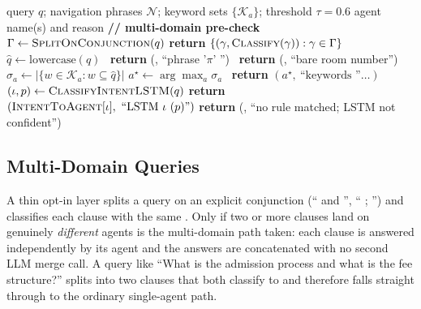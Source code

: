 \begin{algorithm}[!t]
\caption{Multi-Agent Query Routing}
\label{alg:routing}
\begin{algorithmic}[1]
\Require query $q$; navigation phrases $\mathcal{N}$; keyword sets $\{\mathcal{K}_a\}$;
threshold $\tau = 0.6$
\Ensure agent name(s) and reason
\State \textbf{// multi-domain pre-check}
\State $\Gamma \gets \textsc{SplitOnConjunction}(q)$ 
  \State \textbf{return} $\{(\gamma, \textsc{Classify}(\gamma)) : \gamma \in \Gamma\}$ 
\EndIf
\State $\hat q \gets \text{lowercase}(q)$
  \ \textbf{return} (, ``phrase '$\pi$' '') \EndIf
\EndFor
{}\ \textbf{return} (, ``bare room number'') \EndIf
{}\ $\sigma_a \gets |\{w \in \mathcal{K}_a : w \subseteq \hat q\}|$ \EndFor
\State $a^\star \gets \arg\max_a \sigma_a$
\ \textbf{return} $(a^\star,\ \text{``keywords ''} \dots)$ \EndIf
\State $(\iota, p) \gets \textsc{ClassifyIntentLSTM}(q)$ 
  \State \textbf{return} $(\textsc{IntentToAgent}[\iota],\ \text{``LSTM } \iota\ (p)\text{''})$
\EndIf
\State \textbf{return} (, ``no rule matched; LSTM not confident'')
\end{algorithmic}
\end{algorithm}

\subsection{Multi-Domain Queries}
A thin opt-in layer splits a query on an explicit conjunction (`` and '',
`` ; '') and classifies each clause with the same . Only if
two or more clauses land on genuinely \emph{different} agents is the
multi-domain path taken: each clause is answered independently by its agent
and the answers are concatenated with no second LLM merge call. A query
like ``What is the admission process and what is the fee structure?''
splits into two clauses that both classify to  and
therefore falls straight through to the ordinary single-agent path.

